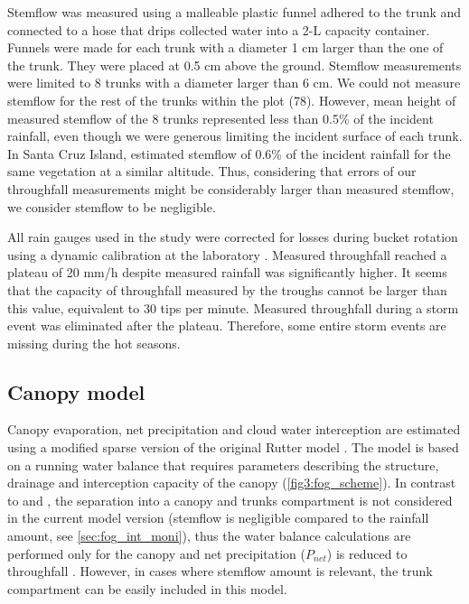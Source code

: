 \documentclass[a4paper,12pt]{article}
\begin{document}
\begin{linenumbers}
Stemflow was measured using a malleable plastic funnel adhered to the trunk and connected to a hose that drips collected water into a 2-L capacity container. Funnels were made for each trunk with a diameter 1 cm larger than the one of the trunk. They were placed at 0.5 cm above the ground. Stemflow measurements were limited to 8 trunks with a diameter larger than 6 cm. We could not measure stemflow for the rest of the trunks within the plot (78). However, mean height of measured stemflow of the 8 trunks represented less than 0.5\% of the incident rainfall, even though we were generous limiting the incident surface of each trunk. In Santa Cruz Island, \cite{Pryetetal2012a} estimated stemflow of 0.6\% of the incident rainfall for the same vegetation at a similar altitude. Thus, considering that errors of our throughfall measurements might be considerably larger than measured stemflow, we consider stemflow to be negligible.

All rain gauges used in the study were corrected for losses during bucket rotation using a dynamic calibration at the laboratory \citep{CalderandKidd1978}. Measured throughfall reached a plateau of 20 mm/h despite measured rainfall was significantly higher. It seems that the capacity of throughfall measured by the troughs cannot be larger than this value, equivalent to 30 tips per minute. Measured throughfall during a storm event was eliminated after the plateau. Therefore, some entire storm events are missing during the hot seasons. 

\subsection{Canopy model}
Canopy evaporation, net precipitation and cloud water interception are estimated using a modified sparse version of the original Rutter model \citep{Rutter1971, Rutter1975}. The model is based on a running water balance that requires parameters describing the structure, drainage and interception capacity of the canopy (\autoref{fig3:fog_scheme}). In contrast to \cite{Rutter1975} and \cite{Valenteetal1997}, the separation into a canopy and trunks compartment is not considered in the current model version (stemflow is negligible compared to the rainfall amount, see \autoref{sec:fog_int_moni}), thus the water balance calculations are performed only for the canopy and net precipitation ($P_{net}$) is reduced to throughfall \citep{Pryetetal2012a}. However, in cases where stemflow amount is relevant, the trunk compartment can be easily included in this model.


\end{linenumbers}
\end{document}

